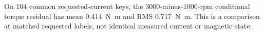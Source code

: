 On 104 common requested-current keys, the 3000-minus-1000-rpm conditional torque residual has mean \SI{0.414}{\newton\metre} and RMS \SI{0.717}{\newton\metre}. This is a comparison at matched requested labels, not identical measured current or magnetic state.
